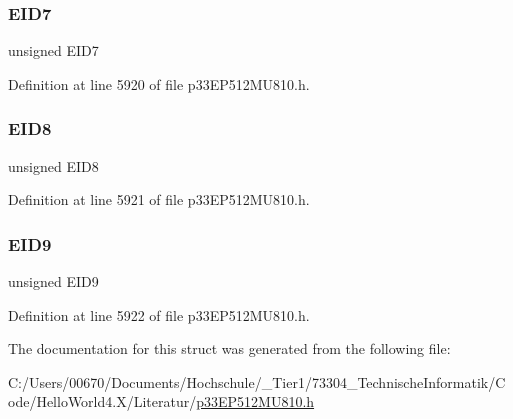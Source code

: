 \subsubsection{\texorpdfstring{E\+I\+D7}{EID7}}
{\footnotesize\ttfamily unsigned E\+I\+D7}



Definition at line 5920 of file p33\+E\+P512\+M\+U810.\+h.

\mbox{\label{structtag_c2_r_x_m0_e_i_d_b_i_t_s_acca25e0b7d86eb499d01f85222baea87}} 
\subsubsection{\texorpdfstring{E\+I\+D8}{EID8}}
{\footnotesize\ttfamily unsigned E\+I\+D8}



Definition at line 5921 of file p33\+E\+P512\+M\+U810.\+h.

\mbox{\label{structtag_c2_r_x_m0_e_i_d_b_i_t_s_ac6748f73d4ada8538b06548be4f396c2}} 
\subsubsection{\texorpdfstring{E\+I\+D9}{EID9}}
{\footnotesize\ttfamily unsigned E\+I\+D9}



Definition at line 5922 of file p33\+E\+P512\+M\+U810.\+h.



The documentation for this struct was generated from the following file\+:\begin{DoxyCompactItemize}
\item 
C\+:/\+Users/00670/\+Documents/\+Hochschule/\+\_\+\+Tier1/73304\+\_\+\+Technische\+Informatik/\+Code/\+Hello\+World4.\+X/\+Literatur/\hyperlink{p33_e_p512_m_u810_8h}{p33\+E\+P512\+M\+U810.\+h}\end{DoxyCompactItemize}
